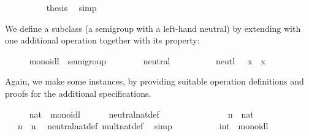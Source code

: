 \begin{isabellebody}
\isanewline
\ \ \ \ \ \ \ \ \isamarkupfalse%
\ {\isacharquery}thesis\ \isamarkupfalse%
\ simp\isanewline
\ \ \ \ \ \ \isamarkupfalse%
\isanewline
\ \ \ \ \isamarkupfalse%
%
\endisatagproof
{\isafoldproof}%
%
\isadelimproof
%
\endisadelimproof
%
\isamarkuptrue%
%
\begin{isamarkuptext}%
We define a subclass  (a semigroup with a left-hand neutral)
  by extending 
  with one additional operation  together
  with its property:%
\end{isamarkuptext}%
\isamarkuptrue%
\ \ \ \ \isamarkupfalse%
\ monoidl\ {\isacharequal}\ semigroup\ {\isacharplus}\isanewline
\ \ \ \ \ \ \ neutral\ {\isacharcolon}{\isacharcolon}\ {\isachardoublequoteopen}{\isasymalpha}{\isachardoublequoteclose}\ {\isacharparenleft}{\isachardoublequoteopen}\isactrlloc {\isasymone}{\isachardoublequoteclose}{\isacharparenright}\isanewline
\ \ \ \ \ \ \ neutl{\isacharcolon}\ {\isachardoublequoteopen}\isactrlloc {\isasymone}\ \isactrlloc {\isasymotimes}\ x\ {\isacharequal}\ x{\isachardoublequoteclose}%
\begin{isamarkuptext}%
\noindent Again, we make some instances, by
  providing suitable operation definitions and proofs for the
  additional specifications.%
\end{isamarkuptext}%
\isamarkuptrue%
\ \ \ \ \isamarkupfalse%
\ nat\ {\isacharcolon}{\isacharcolon}\ monoidl\isanewline
\ \ \ \ \ \ neutral{\isacharunderscore}nat{\isacharunderscore}def{\isacharcolon}\ {\isachardoublequoteopen}{\isasymone}\ {\isasymequiv}\ {}{\isachardoublequoteclose}\isanewline
%
\isadelimproof
\ \ \ \ %
\endisadelimproof
%
\isatagproof
{}\isamarkupfalse%
\isanewline
\ \ \ \ \ \ \isamarkupfalse%
\ n\ {\isacharcolon}{\isacharcolon}\ nat\isanewline
\ \ \ \ \ \ \isamarkupfalse%
\ {\isachardoublequoteopen}{\isasymone}\ {\isasymotimes}\ n\ {\isacharequal}\ n{\isachardoublequoteclose}\ \isamarkupfalse%
\ neutral{\isacharunderscore}nat{\isacharunderscore}def\ mult{\isacharunderscore}nat{\isacharunderscore}def\ \isamarkupfalse%
\ simp\isanewline
\ \ \ \ \isamarkupfalse%
%
\endisatagproof
{\isafoldproof}%
%
\isadelimproof
\isanewline
%
\endisadelimproof
\isanewline
\ \ \ \ \isamarkupfalse%
\ int\ {\isacharcolon}{\isacharcolon}\ monoidl\isanewline

\end{isabellebody}
